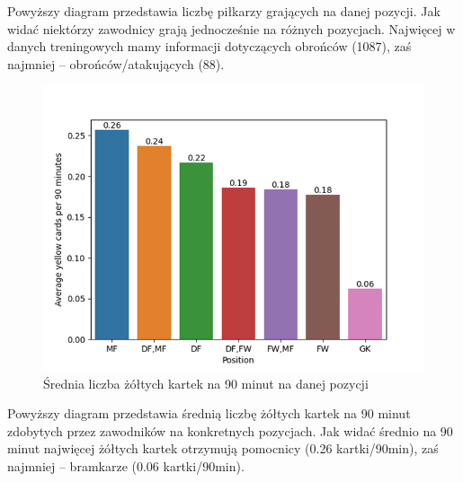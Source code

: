 \documentclass{article}
\begin{document}
Powyższy diagram przedstawia liczbę piłkarzy grających na danej pozycji. Jak widać niektórzy zawodnicy grają jednocześnie na różnych pozycjach. Najwięcej w danych treningowych mamy informacji dotyczących obrońców (1087), zaś najmniej – obrońców/atakujących (88).

\begin{figure}[H]
    \centering
    \includegraphics[scale=1.25]{avg_yellow_crd_90_by_position.png}
    \caption{Średnia liczba żółtych kartek na 90 minut na danej pozycji}
    \label{img:photo2}
\end{figure}

Powyższy diagram przedstawia średnią liczbę żółtych kartek na 90 minut zdobytych przez zawodników na konkretnych pozycjach. Jak widać średnio na 90 minut najwięcej żółtych kartek otrzymują pomocnicy (0.26 kartki/90min), zaś najmniej – bramkarze (0.06 kartki/90min).

\begin{figure}[H]
    \centering
    \hfill
\end{figure}
\end{document}
